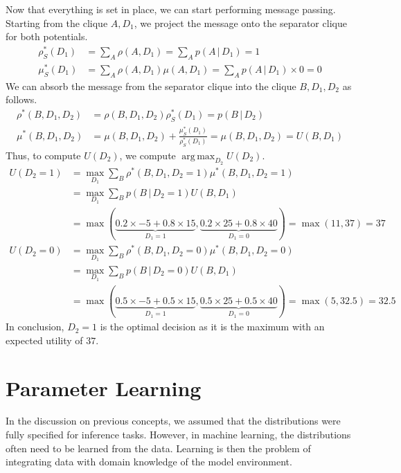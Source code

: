\documentclass{article}
\DeclareMathOperator*{\argmax}{arg\,max}
\newcommand{\giv}{\,|\,}
\begin{document}
\noindent Now that everything is set in place, we can start performing message passing. Starting from the clique $A, D_1$, we project the message onto the separator clique for both potentials.
\begin{align*}
    \rho_S^*(D_1) &= \sum_A \rho(A, D_1) = \sum_A p(A \giv D_1) = 1\\
    \mu_S^*(D_1) &= \sum_A \rho(A, D_1)\mu(A, D_1) = \sum_A p(A \giv D_1) \times 0 = 0
\end{align*}
\noindent We can absorb the message from the separator clique into the clique $B, D_1, D_2$ as follows.
\begin{align*}
    \rho^*(B, D_1, D_2) &= \rho(B, D_1, D_2) \rho_S^*(D_1) = p(B \giv D_2)\\
    \mu^*(B, D_1, D_2) &= \mu(B, D_1, D_2) +\frac{\mu_S^*(D_1)}{\rho_S^*(D_1)} = \mu(B, D_1, D_2) = U(B, D_1)
\end{align*}
\noindent Thus, to compute $U(D_2)$, we compute $\argmax_{D_2} U(D_2)$. 
\begin{align*}
    U(D_2 = 1) &= \max_{D_1} \sum_B \rho^*(B, D_1, D_2=1) \mu^*(B, D_1, D_2=1)\\
    &= \max_{D_1} \sum_B p(B \giv D_2=1) U(B, D_1) \\
    &= \max(\underbrace{0.2 \times -5 + 0.8 \times 15}_{D_1=1}, \underbrace{0.2 \times 25 + 0.8 \times 40}_{D_1=0}) = \max(11, 37) = 37\\
    U(D_2 = 0) &= \max_{D_1} \sum_B \rho^*(B, D_1, D_2=0) \mu^*(B, D_1, D_2=0)\\
    &= \max_{D_1} \sum_B p(B \giv D_2=0) U(B, D_1) \\
    &= \max(\underbrace{0.5 \times -5 + 0.5 \times 15}_{D_1=1}, \underbrace{0.5 \times 25 + 0.5 \times 40}_{D_1=0}) = \max(5, 32.5) = 32.5
\end{align*}
\noindent In conclusion, $D_2 = 1$ is the optimal decision as it is the maximum with an expected utility of $37$. 

\newpage
\section{Parameter Learning}

In the discussion on previous concepts, we assumed that the distributions were fully specified for inference tasks. However, in machine learning, the distributions often need to be learned from the data. Learning is then the problem of integrating data with domain knowledge of the model environment. 
\end{document}
